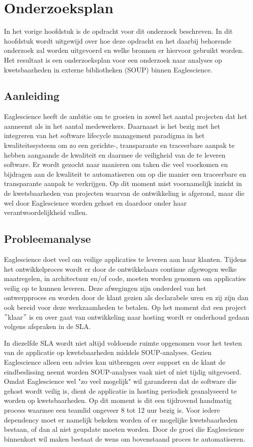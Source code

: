 \chapter{Onderzoeksplan}\label{ch:onderzoekPlan}

In het vorige hoofdstuk is de opdracht voor dit onderzoek beschreven. In dit hoofdstuk wordt uitgewijd over hoe deze opdracht en het daarbij behorende onderzoek zal worden uitgevoerd en welke bronnen er hiervoor gebruikt worden. Het resultaat is een onderzoeksplan voor een onderzoek naar analyses op kwetsbaarheden in externe bibliotheken (SOUP) binnen Eaglescience.


\section{Aanleiding}\label{sec:OP_aanleiding}
Eaglescience heeft de ambitie om te groeien in zowel het aantal projecten dat het aanneemt als in het aantal medewerkers. Daarnaast is het bezig met het integreren van het software lifecycle management paradigma in het kwaliteitssysteem om zo een gerichte-, transparante en traceerbare aanpak te hebben aangaande de kwaliteit en daarmee de veiligheid van de te leveren software. Er wordt gezocht naar manieren om taken die veel voorkomen en bijdragen aan de kwaliteit te automatiseren om op die manier een traceerbare en transparante aanpak te verkrijgen. Op dit moment mist voornamelijk inzicht in de kwetsbaarheden van projecten waarvan de ontwikkeling is afgerond, maar die wel door Eaglescience worden gehost en daardoor onder haar verantwoordelijkheid vallen.


\section{Probleemanalyse}\label{sec:probleemanalyse}
Eaglescience doet veel om veilige applicaties te leveren aan haar klanten. Tijdens het ontwikkelproces wordt er door de ontwikkelaars continue afgewogen welke maatregelen, in architectuur en/of code, moeten worden genomen om applicaties veilig op te kunnen leveren. Deze afwegingen zijn onderdeel van het ontwerpproces en worden door de klant gezien als declarabele uren en zij zijn dan ook bereid voor deze werkzaamheden te betalen. Op het moment dat een project $"$klaar$"$ is en over gaat van ontwikkeling naar hosting wordt er onderhoud gedaan volgens afspraken in de SLA.

In diezelfde SLA wordt niet altijd voldoende ruimte opgenomen voor het testen van de applicatie op kwetsbaarheden middels SOUP-analyses. Gezien Eaglescience alleen een advies kan uitbrengen over support en de klant de eindbeslissing neemt worden SOUP-analyses vaak niet of niet tijdig uitgevoerd. Omdat Eaglescience wel "zo veel mogelijk" wil garanderen dat de software die gehost wordt veilig is, dient de applicatie in hosting periodiek geanalyseerd te worden op kwetsbaarheden. Op dit moment is dit een tijdrovend handmatig process waarmee een teamlid ongeveer 8 tot 12 uur bezig is. Voor iedere dependency moet er namelijk bekeken worden of er mogelijke kwetsbaarheden bestaan, of dan al niet geupdate moeten worden. Door de groei die Eaglescience binnenkort wil maken bestaat de wens om bovenstaand proces te automatiseren.

